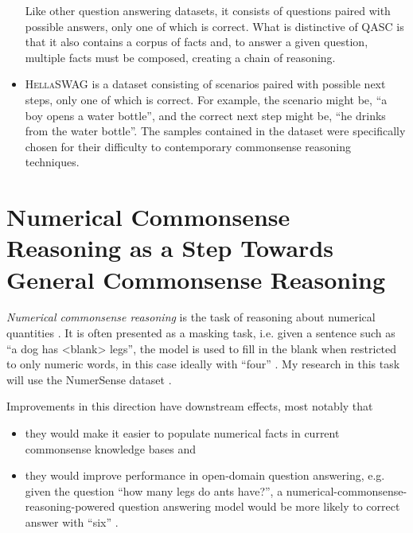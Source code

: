 \documentclass[12pt]{report}
\begin{document}
\begin{itemize}
        Like other question answering datasets, it consists of questions paired with possible answers, only one of which is correct.
        What is distinctive of QASC is that it also contains a corpus of facts and, to answer a given question, multiple facts must be composed, creating a chain of reasoning.
    \item
        \textsc{HellaSWAG} \cite{Zellers2019-gw} is a dataset consisting of scenarios paired with possible next steps, only one of which is correct.
        For example, the scenario might be, \enquote{a boy opens a water bottle}, and the correct next step might be, \enquote{he drinks from the water bottle}.
        The samples contained in the dataset were specifically chosen for their difficulty to contemporary commonsense reasoning techniques.
\end{itemize}

\section{Numerical Commonsense Reasoning as a Step Towards General Commonsense Reasoning}

\textit{Numerical commonsense reasoning} is the task of reasoning about numerical quantities \cite{Lin2020-ik}.
It is often presented as a masking task, i.e. given a sentence such as \enquote{a dog has <blank> legs}, the model is used to fill in the blank when restricted to only numeric words, in this case ideally with \enquote{four} \cite{Lin2020-ik,Bian2023-rj}.
My research in this task will use the NumerSense dataset \cite{Lin2020-ik}.

Improvements in this direction have downstream effects, most notably that
\begin{itemize}[nolistsep]
    \item they would make it easier to populate numerical facts in current commonsense knowledge bases \cite{Lin2020-ik} and
    \item they would improve performance in open-domain question answering, e.g. given the question \enquote{how many legs do ants have?}, a numerical-commonsense-reasoning-powered question answering model would be more likely to correct answer with \enquote{six} \cite{Lin2020-ik}.
\end{itemize}
\end{document}
